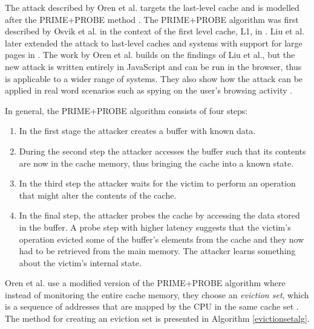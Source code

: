 \documentclass[10pt,a4paper,twoside]{book}
\begin{document}
The attack described by Oren et al. targets the last-level cache and is modelled after the PRIME+PROBE method \cite{oren2015spy}. The PRIME+PROBE algorithm was first described by Osvik et al. in the context of the first level cache, L1, in \cite{osvik2006cache}. Liu et al. later extended the attack to last-level caches and systems with support for large pages in \cite{liu2015last}. The work by Oren et al. builds on the findings of Liu et al., but the new attack is written entirely in JavaScript and can be run in the browser, thus is applicable to a wider range of systems. They also show how the attack can be applied in real word scenarios such as spying on the user's browsing activity \cite{oren2015spy}.

In general, the PRIME+PROBE algorithm consists of four steps:
\begin{enumerate}
\item In the first stage the attacker creates a buffer with known data.
\item During the second step the attacker accesses the buffer such that its contents are now in the cache memory, thus bringing the cache into a known state.
\item In the third step the attacker waits for the victim to perform an operation that might alter the contents of the cache.
\item In the final step, the attacker probes the cache by accessing the data stored in the buffer. A probe step with higher latency suggests that the victim's operation evicted some of the buffer's elements from the cache and they now had to be retrieved from the main memory. The attacker learns something about the victim's internal state.
\end{enumerate}

Oren et al. use a modified version of the PRIME+PROBE algorithm where instead of monitoring the entire cache memory, they choose an \textit{eviction set}, which is a sequence of addresses that are mapped by the CPU in the same cache set \cite{oren2015spy}. The method for creating an eviction set is presented in Algorithm \ref{evictionsetalg}.
\end{document}
